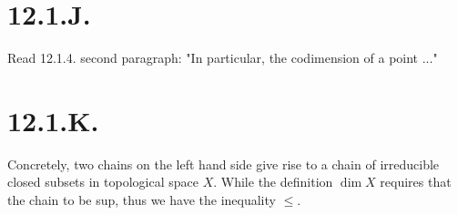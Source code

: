 \section{12.1.J.}

Read 12.1.4. second paragraph: "In particular, the codimension of a point ..."

\section{12.1.K.}

Concretely, two chains on the left hand side give rise to a chain of irreducible closed subsets in topological space $X$. While the definition $\dim X$ requires that the chain to be sup, thus we have the inequality $\leq$.